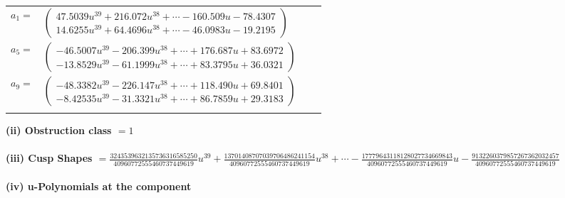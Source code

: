 \documentclass[1p]{elsarticle_modified}
\theoremstyle{definition}
\begin{document}
\begin{tabular}{m{7pt} m{180pt} m{7pt} m{180pt} }
\flushright $a_{1}=$&$\begin{pmatrix}47.5039 u^{39}+216.072 u^{38}+\cdots-160.509 u-78.4307\\14.6255 u^{39}+64.4696 u^{38}+\cdots-46.0983 u-19.2195\end{pmatrix}$ \\
\flushright $a_{5}=$&$\begin{pmatrix}-46.5007 u^{39}-206.399 u^{38}+\cdots+176.687 u+83.6972\\-13.8529 u^{39}-61.1999 u^{38}+\cdots+83.3795 u+36.0321\end{pmatrix}$ \\
\flushright $a_{9}=$&$\begin{pmatrix}-48.3382 u^{39}-226.147 u^{38}+\cdots+118.490 u+69.8401\\-8.42535 u^{39}-31.3321 u^{38}+\cdots+86.7859 u+29.3183\end{pmatrix}$\\&\end{tabular}
\flushleft \textbf{(ii) Obstruction class $= 1$}\\~\\
\flushleft \textbf{(iii) Cusp Shapes $= \frac{3243539632135736316585250}{40960772555460737449619} u^{39}+\frac{13701408707039706486241154}{40960772555460737449619} u^{38}+\cdots-\frac{17779643118128027734669843}{40960772555460737449619} u-\frac{9132260379857267362032457}{40960772555460737449619}$}\\~\\
\newpage\renewcommand{\arraystretch}{1}
\flushleft \textbf{(iv) u-Polynomials at the component}\newline \\
\end{document}
